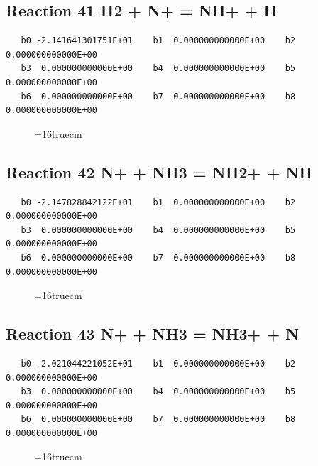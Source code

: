 \documentclass[12pt,dvipdfm]{article}
\begin{document}
\subsection{
Reaction 41 H2 + N+ = NH+ + H}
\begin{small}\begin{verbatim}
   b0 -2.141641301751E+01    b1  0.000000000000E+00    b2  0.000000000000E+00
   b3  0.000000000000E+00    b4  0.000000000000E+00    b5  0.000000000000E+00
   b6  0.000000000000E+00    b7  0.000000000000E+00    b8  0.000000000000E+00
   \end{verbatim}\end{small}
\begin{figure}[h!]
\label{n2rates}
\epsfxsize=16truecm
\end{figure}
\newpage

\subsection{
Reaction 42 N+ + NH3 = NH2+ + NH}
\begin{small}\begin{verbatim}
   b0 -2.147828842122E+01    b1  0.000000000000E+00    b2  0.000000000000E+00
   b3  0.000000000000E+00    b4  0.000000000000E+00    b5  0.000000000000E+00
   b6  0.000000000000E+00    b7  0.000000000000E+00    b8  0.000000000000E+00
   \end{verbatim}\end{small}
\begin{figure}[h!]
\label{n2rates}
\epsfxsize=16truecm
\end{figure}
\newpage

\subsection{
Reaction 43 N+ + NH3 = NH3+ + N}
\begin{small}\begin{verbatim}
   b0 -2.021044221052E+01    b1  0.000000000000E+00    b2  0.000000000000E+00
   b3  0.000000000000E+00    b4  0.000000000000E+00    b5  0.000000000000E+00
   b6  0.000000000000E+00    b7  0.000000000000E+00    b8  0.000000000000E+00
   \end{verbatim}\end{small}
\begin{figure}[h!]
\label{n2rates}
\epsfxsize=16truecm
\end{figure}
\newpage
\end{document}

